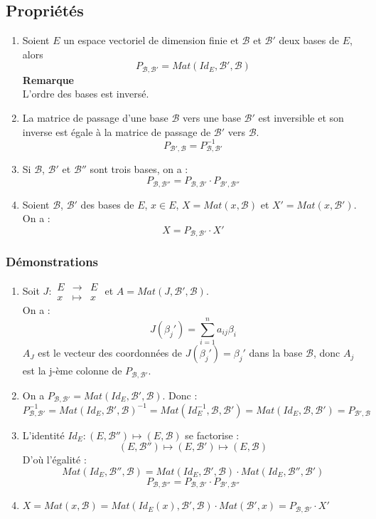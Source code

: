 \documentclass[a4paper,10pt]{book} %
\newcommand{\B}{\mathcal{B}}
\begin{document}
\subsection{Propriétés}
\begin{enumerate}
\item Soient $E$ un espace vectoriel de dimension finie et $\B$ et $\B'$ deux bases de $E$, alors $$P_{\B,\B'}=Mat(Id_E,\B',\B)$$
\textbf{Remarque}\\
L'ordre des bases est inversé.\\

\item La matrice de passage d'une base $\B$ vers une base $\B'$ est inversible et son inverse est égale à la matrice de passage de $\B'$ vers $\B$.
$$P_{\B',\B}=P_{\B,\B'}^{-1}$$
\item Si $\B$, $\B'$ et $\B''$ sont trois bases, on a :
$$P_{\B,\B''}=P_{\B,\B'}\cdot P_{\B',\B''}$$
\item Soient $\B$, $\B'$ des bases de $E$, $x\in E$, $X=Mat(x,\B)$ et $X'=Mat(x,\B')$. On a :
$$X=P_{\B,\B'}\cdot X'$$
\end{enumerate}

\subsubsection{Démonstrations}
\begin{enumerate}
\item Soit $J: \begin{array}{rcl} E &\rightarrow& E \\ x &\mapsto& x \end{array}$ et $A=Mat(J,\B',\B)$.\\

On a :
$$J(\beta_{j}')=\sum_{i=1}^{n}a_{ij}\beta_{i}$$
$A_J$ est le vecteur des coordonnées de $J(\beta_{j}')= \beta_{j}'$ dans la base $\B$, donc $A_j$ est la j-ème colonne de $P_{\B,\B'}$.\\

\item On a $P_{\B,\B'}=Mat(Id_E, \B',\B)$. Donc :
$$P_{\B,\B'}^{-1}=Mat(Id_E,\B',\B)^{-1}=Mat(Id_E^{-1},\B,\B')=Mat(Id_E,\B,\B')=P_{\B',\B}$$
\smallskip
\item L'identité $Id_E:(E,\B'')\mapsto (E,\B)$ se factorise :
$$(E,\B'')\mapsto (E,\B')\mapsto (E,\B)$$
D'où l'égalité :
$$Mat(Id_E,\B'',\B)=Mat(Id_E,\B',\B)\cdot Mat(Id_E,\B'',\B')$$
$$P_{\B,\B''}=P_{\B,\B'}\cdot P_{\B',\B''}$$
\smallskip
\item $X=Mat(x,\B)=Mat(Id_E(x),\B',\B)\cdot Mat(\B',x)=P_{\B,\B'}\cdot X'$
\end{enumerate}
\end{document}
